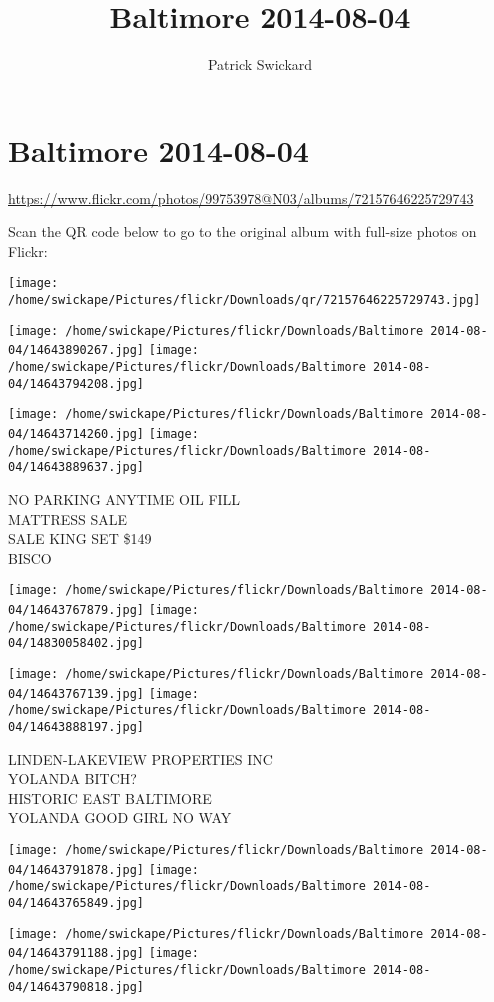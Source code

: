 \documentclass[10pt,letterpaper]{article}
\title{Baltimore 2014-08-04}
\author{Patrick Swickard}
\date{}
\begin{document}
\section*{Baltimore 2014-08-04}

\url{https://www.flickr.com/photos/99753978@N03/albums/72157646225729743}

Scan the QR code below to go to the original album with full-size photos on Flickr:

\texttt{[image: /home/swickape/Pictures/flickr/Downloads/qr/72157646225729743.jpg]}
\pagebreak

\texttt{[image: /home/swickape/Pictures/flickr/Downloads/Baltimore 2014-08-04/14643890267.jpg]}
\texttt{[image: /home/swickape/Pictures/flickr/Downloads/Baltimore 2014-08-04/14643794208.jpg]}

\texttt{[image: /home/swickape/Pictures/flickr/Downloads/Baltimore 2014-08-04/14643714260.jpg]}
\texttt{[image: /home/swickape/Pictures/flickr/Downloads/Baltimore 2014-08-04/14643889637.jpg]}

NO PARKING ANYTIME OIL FILL\\
MATTRESS SALE\\
SALE KING SET \$149\\
BISCO
\pagebreak

\texttt{[image: /home/swickape/Pictures/flickr/Downloads/Baltimore 2014-08-04/14643767879.jpg]}
\texttt{[image: /home/swickape/Pictures/flickr/Downloads/Baltimore 2014-08-04/14830058402.jpg]}

\texttt{[image: /home/swickape/Pictures/flickr/Downloads/Baltimore 2014-08-04/14643767139.jpg]}
\texttt{[image: /home/swickape/Pictures/flickr/Downloads/Baltimore 2014-08-04/14643888197.jpg]}

LINDEN{-}LAKEVIEW PROPERTIES INC\\
YOLANDA BITCH?\\
HISTORIC EAST BALTIMORE\\
YOLANDA GOOD GIRL NO WAY
\pagebreak

\texttt{[image: /home/swickape/Pictures/flickr/Downloads/Baltimore 2014-08-04/14643791878.jpg]}
\texttt{[image: /home/swickape/Pictures/flickr/Downloads/Baltimore 2014-08-04/14643765849.jpg]}

\texttt{[image: /home/swickape/Pictures/flickr/Downloads/Baltimore 2014-08-04/14643791188.jpg]}
\texttt{[image: /home/swickape/Pictures/flickr/Downloads/Baltimore 2014-08-04/14643790818.jpg]}
\end{document}
